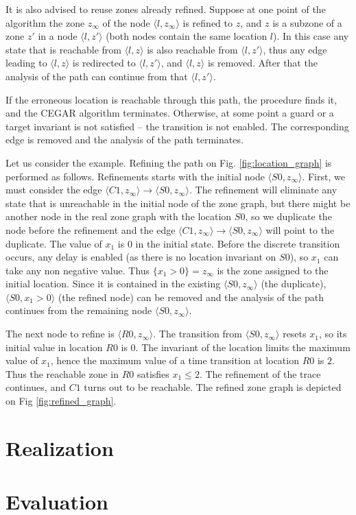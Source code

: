 It is also advised to reuse zones already refined. Suppose at one point of the
algorithm the zone $z_\infty$ of the node $\langle l,z_\infty \rangle$ is 
refined to $z$, and $z$ is a
subzone of a zone $z'$ in a node $\langle l,z' \rangle$ (both nodes
contain the same location $l$). In this case any state that is reachable from $\langle l,z \rangle$ is also reachable from $\langle l,z' \rangle$, thus any edge leading to  $\langle l,z \rangle$ is redirected to $\langle l,z' \rangle$, and $\langle l,z \rangle$ is removed.
After that the analysis of the path can continue from that $\langle l,z' \rangle$.

If the erroneous location is reachable through this path, the procedure finds it,
and the CEGAR algorithm terminates. Otherwise, at some point a guard or a target invariant
is not satisfied -- the transition is not enabled. The corresponding edge is removed and the analysis of the path terminates.

Let us consider the example. Refining the path on Fig. \ref{fig:location_graph} is performed as follows. Refinements starts with the initial node $\langle S0,z_\infty \rangle$. First, we must consider the edge $\langle C1,z_\infty \rangle \to \langle S0,z_\infty \rangle$. The refinement will eliminate any state that is unreachable in the initial node of the zone graph, but there might be another node in the real zone graph with the location $S0$, so we duplicate the node before the refinement and the edge $\langle C1,z_\infty \rangle \to \langle S0,z_\infty \rangle$ will point to the duplicate. The value of $x_1$ is 0 in the initial state. Before the discrete transition occurs, any delay is enabled (as there is no location invariant on $S0$), so $x_1$ can take any non negative value. Thus $\{x_1 > 0\} = z_\infty$ is the zone assigned to the initial location. Since it is contained in the existing $\langle S0,z_\infty \rangle$ (the duplicate),  $\langle S0,x_1 > 0 \rangle$ (the refined node) can be removed and the analysis of the path continues from the remaining node $\langle S0,z_\infty \rangle$.

The next node to refine is $\langle R0,z_\infty \rangle$. The transition from $\langle S0,z_\infty \rangle$ resets $x_1$, so its initial value in location $R0$ is 0. The invariant of the location limits the maximum value of $x_1$, hence the maximum value of a time transition at location $R0$ is $2$. Thus the reachable zone in $R0$ satisfies $x_1 \leq 2$. The refinement of the trace continues, and $C1$ turns out to be reachable. The refined zone graph is depicted on Fig \ref{fig:refined_graph}.

\section{Realization}


\section{Evaluation}

